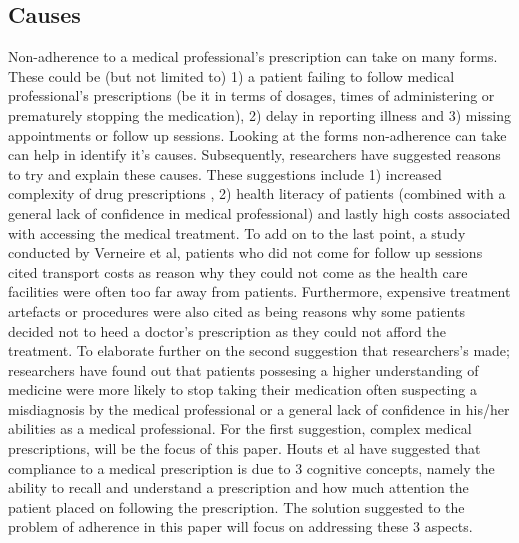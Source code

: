 \subsection{Causes}
Non-adherence to a medical professional's prescription can take on many forms. These could be (but not limited to) 1) a patient failing to follow medical professional's prescriptions (be it in terms of dosages, times of administering or prematurely stopping the medication), 2) delay in reporting illness and 3) missing appointments or follow up sessions\cite{Vern01}. Looking at the forms non-adherence can take can help in identify it's causes. Subsequently, researchers have suggested reasons to try and explain these causes. These suggestions include 1) increased complexity of drug prescriptions \cite{Fernerty12}, 2) health literacy of patients (combined with a general lack of confidence in medical professional)\cite{Kali99} and lastly high costs associated with accessing the medical treatment\cite{Vern01}. To add on to the last point, a study conducted by Verneire et al\cite{Vern01}, patients who did not come for follow up sessions cited transport costs as reason why they could not come as the health care facilities were often too far away from patients. Furthermore, expensive treatment artefacts or procedures were also cited as being reasons why some patients decided not to heed a doctor's prescription as they could not afford the treatment. To elaborate further on the second suggestion that researchers's made; researchers have found out that patients possesing a higher understanding of medicine were more likely to stop taking their medication often suspecting a misdiagnosis by the medical professional or a general lack of confidence in his/her abilities as a medical professional\cite{WilsonWolf}. For the first suggestion, complex medical prescriptions, will be the focus of this paper. Houts et al\cite{Houts06} have suggested that compliance to a medical prescription is due to 3 cognitive concepts, namely the ability to recall and understand a prescription and how much attention the patient placed on following the prescription. The solution suggested to the problem of adherence in this paper will focus on addressing these 3 aspects.
